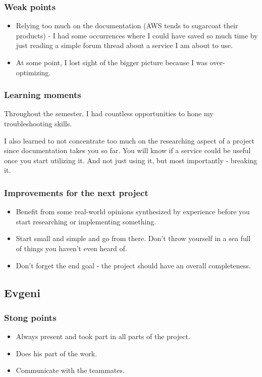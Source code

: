 \documentclass[10pt, a4paper]{article}
\begin{document}
\subsubsection{Weak points}
\begin{itemize}
	\item Relying too much on the documentation (AWS tends to sugarcoat their products) - I had some occurrences where I could have saved so much time by just reading a simple forum thread about a service I am about to use.
	\item At some point, I lost sight of the bigger picture because I was over-optimizing.
\end{itemize}

\subsubsection{Learning moments}

Throughout the semester, I had countless opportunities to hone my troubleshooting skills.

I also learned to not concentrate too much on the researching aspect of a project since documentation takes you so far. You will know if a service could be useful once you start utilizing it. And not just using it, but most importantly - breaking it.

\subsubsection{Improvements for the next project}
\begin{itemize}
    \item Benefit from some real-world opinions synthesized by experience before you start researching or implementing something. 
    \item Start small and simple and go from there. Don't throw yourself in a sea full of things you haven't even heard of.
    \item Don't forget the end goal - the project should have an overall completeness.
\end{itemize}


\subsection{Evgeni}
\subsubsection{Stong points}
\begin{itemize}
	\item Always present and took part in all parts of the project.
	\item Does his part of the work.
	\item Communicate with the teammates.
\end{itemize}
\end{document}
